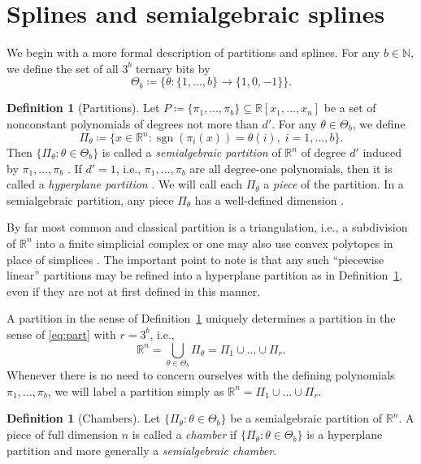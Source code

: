 \documentclass[11pt]{amsart}
\theoremstyle{plain}
\theoremstyle{definition}
\newtheorem{definition}[theorem]{Definition}
\DeclareMathOperator{\sgn}{sgn}
\begin{document}
\section{Splines and semialgebraic splines}\label{sec:splines}

We begin with a more formal description of partitions and splines. For any $b \in \mathbb{N}$, we define the set of all $3^b$ ternary bits by
\begin{equation}\label{eq:Phi}
\Theta_b \coloneqq \bigl\{ \theta: \{1, \dots, b\} \to \{1, 0, -1\} \bigr\}.
\end{equation}
\begin{definition}[Partitions]\label{def:par}
Let $P \coloneqq \{\pi_1, \dots, \pi_b\} \subseteq \mathbb{R}[x_1, \dots, x_n]$ be a set of nonconstant polynomials of degrees not more than $d'$. For any $\theta \in \Theta_b$, we define
\[
\Pi_{\theta} \coloneqq \{x \in\mathbb{R}^n : \sgn(\pi_i(x)) = \theta(i), \; i = 1,\dots,b\}.
\]
Then $\{\Pi_{\theta} : \theta \in \Theta_b \}$ is called a \emph{semialgebraic partition} of $\mathbb{R}^n$ of degree $d'$ induced by $\pi_1,\dots,\pi_b$ \cite{bochnak2013real}. If $d' =1$, i.e., $\pi_1,\dots,\pi_b$ are all degree-one polynomials, then it is called a \emph{hyperplane partition} \cite{Aguiar}. 
We will call each $\Pi_\theta$ a \emph{piece} of the partition. In a semialgebraic partition, any piece $\Pi_\theta$ has a well-defined dimension \cite{bochnak2013real}.
\end{definition}
By far most common and classical partition is a triangulation, i.e., a subdivision of $\mathbb{R}^n$ into a finite simplicial complex \cite{hatcher} or one may also use convex polytopes in place of simplices \cite{Chui, BoxSpline, Wang2002}. The important point to note is that any such ``piecewise linear'' partitions may be refined into a hyperplane partition as in Definition~\ref{def:par}, even if they are not at first defined in this manner.

A partition in the sense  of Definition~\ref{def:par} uniquely determines a partition in the sense of \eqref{eq:part} with $r = 3^b$, i.e.,
\[
\mathbb{R}^n = \bigcup_{\theta \in \Theta_b} \Pi_\theta = \Pi_1 \cup \dots \cup \Pi_r.
\]
Whenever there is no need to concern ourselves with the defining polynomials $\pi_1,\dots,\pi_b$, we will label a partition simply as $\mathbb{R}^n = \Pi_1 \cup \dots \cup \Pi_r$.
\begin{definition}[Chambers]\label{def:cham}
Let  $\{\Pi_{\theta} : \theta \in \Theta_b \}$ be a semialgebraic partition of $\mathbb{R}^n$. A piece of full dimension $n$ is called a \emph{chamber} \cite{Aguiar} if $\{\Pi_{\theta} : \theta \in \Theta_b \}$ is a hyperplane partition and more generally a \emph{semialgebraic chamber}.
\end{definition}
\end{document}
